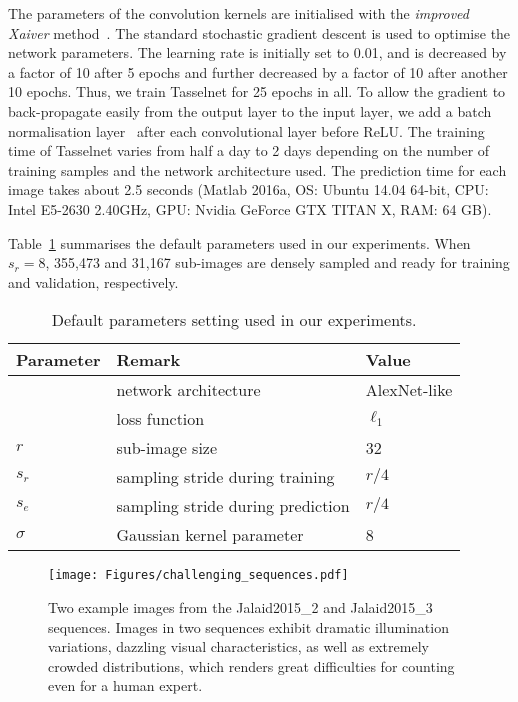 \documentclass[twocolumn]{bmcart}%
\begin{document}
The parameters of the convolution kernels are initialised with the \textit{improved Xaiver} method~\cite{he2015delving}. The standard stochastic gradient descent is used to optimise the network parameters. The learning rate is initially set to 0.01, and is decreased by a factor of 10 after 5 epochs and further decreased by a factor of 10 after another 10 epochs. Thus, we train Tasselnet for 25 epochs in all. To allow the gradient to back-propagate easily from the output layer to the input layer, we add a batch normalisation layer~\cite{ioffe2015batch} after each convolutional layer before ReLU. The training time of Tasselnet varies from half a day to 2 days depending on the number of training samples and the network architecture used. The prediction time for each image takes about 2.5 seconds (Matlab 2016a, OS: Ubuntu 14.04 64-bit, CPU: Intel E5-2630 2.40GHz, GPU: Nvidia GeForce GTX TITAN X, RAM: 64 GB).

Table~\ref{tab:parameters} summarises the default parameters used in our experiments. When $s_r=8$, 355,473 and 31,167 sub-images are densely sampled and ready for training and validation, respectively.

\begin{table}[!t]
	\centering
	\caption{Default parameters setting used in our experiments.}
	\label{tab:parameters}
	\renewcommand\arraystretch{1.25}
	\addtolength{\tabcolsep}{-1pt}
	\begin{tabular}{l|ll}
		\hline
		Parameter & Remark & Value\\
		\hline
		& network architecture & AlexNet-like\\
		& loss function & $\ell_1$\\
		\hline
		$r$ & sub-image size & 32 \\
		$s_r$ & sampling stride during training & $r/4$\\
		$s_e$ & sampling stride during prediction & $r/4$\\
		$\sigma$ & Gaussian kernel parameter & 8\\
		\hline
	\end{tabular}
\end{table}

\begin{figure*}[!t]
	\centering
	\texttt{[image: Figures/challenging\_sequences.pdf]}
	\caption{Two example images from the Jalaid2015\_2 and Jalaid2015\_3 sequences. Images in two sequences exhibit dramatic illumination variations, dazzling visual characteristics, as well as extremely crowded distributions, which renders great difficulties for counting even for a human expert.}
	\label{fig:challenging_seq}
\end{figure*}
\end{document}
